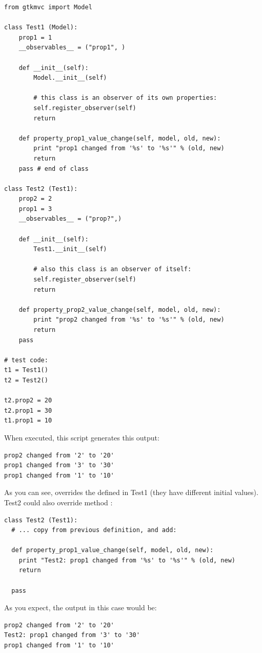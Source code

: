 { \codesize
\begin{verbatim} 
from gtkmvc import Model

class Test1 (Model):
    prop1 = 1
    __observables__ = ("prop1", )

    def __init__(self):
        Model.__init__(self)

        # this class is an observer of its own properties:
        self.register_observer(self) 
        return
    
    def property_prop1_value_change(self, model, old, new):
        print "prop1 changed from '%s' to '%s'" % (old, new)
        return
    pass # end of class

class Test2 (Test1):    
    prop2 = 2
    prop1 = 3
    __observables__ = ("prop?",)
    
    def __init__(self):
        Test1.__init__(self)
        
        # also this class is an observer of itself:
        self.register_observer(self)
        return
    
    def property_prop2_value_change(self, model, old, new):
        print "prop2 changed from '%s' to '%s'" % (old, new)
        return
    pass

# test code:
t1 = Test1()
t2 = Test2()

t2.prop2 = 20
t2.prop1 = 30
t1.prop1 = 10
\end{verbatim}
}

When executed, this script generates this output:
{ \codesize 
\begin{verbatim} 
prop2 changed from '2' to '20'
prop1 changed from '3' to '30'
prop1 changed from '1' to '10'
\end{verbatim}
}

As you can see,  overrides the \OP {}
defined in Test1 (they have different initial values).  Test2 could
also override method :

{ \codesize 
\begin{verbatim} 
class Test2 (Test1):
  # ... copy from previous definition, and add:
   
  def property_prop1_value_change(self, model, old, new):
    print "Test2: prop1 changed from '%s' to '%s'" % (old, new)
    return   

  pass
\end{verbatim}
}

As you expect, the output in this case would be:
{ \codesize 
\begin{verbatim} 
prop2 changed from '2' to '20'
Test2: prop1 changed from '3' to '30'
prop1 changed from '1' to '10'
\end{verbatim}
}


